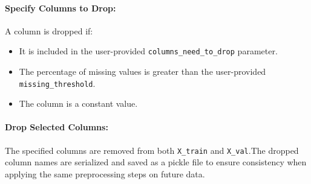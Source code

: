 \paragraph{Specify Columns to Drop:}\par
A column is dropped if:
\begin{itemize}
    \item It is included in the user-provided \texttt{columns\_need\_to\_drop} parameter.
    \item The percentage of missing values is greater than the user-provided \texttt{missing\_threshold}.
    \item The column is a constant value.
\end{itemize}
\paragraph{Drop Selected Columns:}\par
The specified columns are removed from both \texttt{X\_train} and \texttt{X\_val}.The dropped column names are serialized and saved as a pickle file to ensure consistency when applying the same preprocessing steps on future data.
\vspace{1cm}
